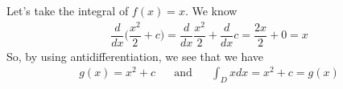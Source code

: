 \begin{example}
Let's take the integral of $f(x) = x$. We know 
\begin{align*}
    \dfrac{d}{dx} \Big(\dfrac{x^{2}}{2} + c \Big) = \dfrac{d}{dx} \dfrac{x^{2}}{2} + \dfrac{d}{dx} c = \dfrac{2x}{2} + 0 = x
\end{align*}
So, by using antidifferentiation, we see that we have
\begin{align*}
    g(x) = x^{2} + c \hspace{20pt} \text{and} \hspace{20pt} \int_{D} x dx  =  x^{2} + c = g(x)
\end{align*}
\end{example}